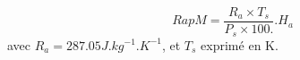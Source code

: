 \[
RapM = \frac{ R_a \times T_s }{P_s \times 100.} . H_a
\]
avec $R_a = 287.05 J.kg^{-1}.K^{-1} $, et $T_s$ exprim\'e en K.
